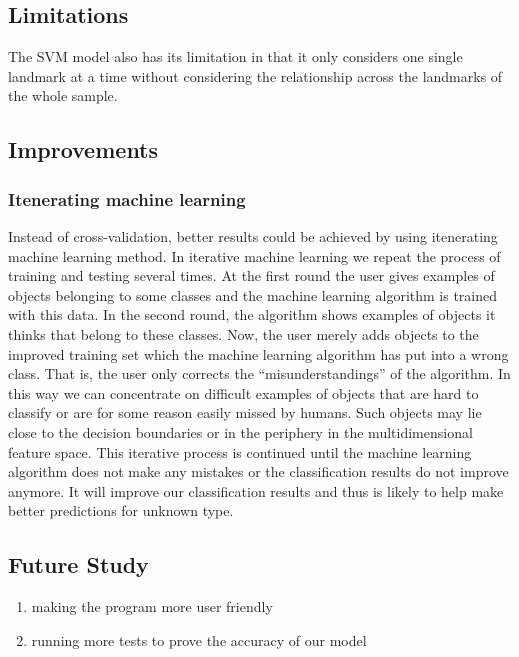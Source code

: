 \documentclass[10pt,letterpaper]{article}
\providecommand{\tightlist}{%
  \setlength{\itemsep}{0pt}\setlength{\parskip}{0pt}}
\begin{document}
\subsection{Limitations}\label{limitations}

The SVM model also has its limitation in that it only considers one
single landmark at a time without considering the relationship across
the landmarks of the whole sample.

\subsection{Improvements}\label{improvements}

\subsubsection{Itenerating machine
learning}\label{itenerating-machine-learning}

Instead of cross-validation, better results could be achieved by using
itenerating machine learning method. In iterative machine learning we
repeat the process of training and testing several times. At the first
round the user gives examples of objects belonging to some classes and
the machine learning algorithm is trained with this data. In the second
round, the algorithm shows examples of objects it thinks that belong to
these classes. Now, the user merely adds objects to the improved
training set which the machine learning algorithm has put into a wrong
class. That is, the user only corrects the ``misunderstandings'' of the
algorithm. In this way we can concentrate on difficult examples of
objects that are hard to classify or are for some reason easily missed
by humans. Such objects may lie close to the decision boundaries or in
the periphery in the multidimensional feature space. This iterative
process is continued until the machine learning algorithm does not make
any mistakes or the classification results do not improve anymore. It
will improve our classification results and thus is likely to help make
better predictions for unknown type.

\subsection{Future Study}\label{future-study}

\begin{enumerate}
\def\labelenumi{\arabic{enumi}.}
\tightlist
\item
  making the program more user friendly
\item
  running more tests to prove the accuracy of our model
\end{enumerate}
\end{document}
